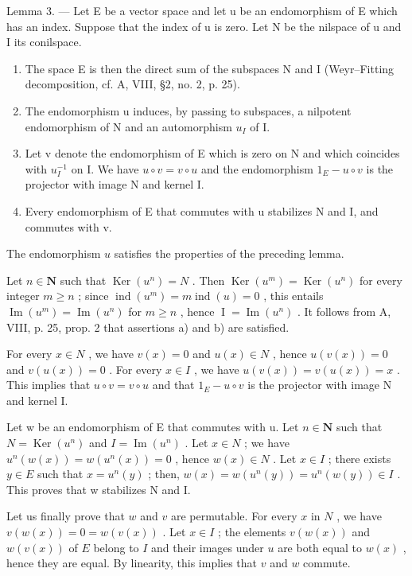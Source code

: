 Lemma 3. --- Let E be a vector space and let u be an endomorphism of E which has an index. Suppose that the index of u is zero. Let N be the nilspace of u and I its conilspace.

\begin{enumerate}
\def\labelenumi{\alph{enumi})}
\item
  The space E is then the direct sum of the subspaces N and I (Weyr–Fitting decomposition, cf. A, VIII, §2, no. 2, p. 25).
\item
  The endomorphism u induces, by passing to subspaces, a nilpotent endomorphism of N and an automorphism \(u_{I}\) of I.
\item
  Let v denote the endomorphism of E which is zero on N and which coincides with \(u_{I}^{-1}\) on I. We have \(u \circ v = v \circ u\) and the endomorphism \(1_{E} - u \circ v\) is the projector with image N and kernel I.
\item
  Every endomorphism of E that commutes with u stabilizes N and I, and commutes with v.
\end{enumerate}

The endomorphism \(u\) satisfies the properties of the preceding lemma.

Let \(n \in \mathbf{N}\) such that \(\operatorname{Ker}(u^{n}) = N\) . Then \(\operatorname{Ker}(u^{m}) = \operatorname{Ker}(u^{n})\) for every integer \(m \geqslant n\) ; since \(\operatorname{ind}(u^{m}) = m \operatorname{ind}(u) = 0\) , this entails \(\operatorname{Im}(u^{m}) = \operatorname{Im}(u^{n})\) for \(m \geqslant n\) , hence \(\operatorname{I} = \operatorname{Im}(u^{n})\) . It follows from A, VIII, p. 25, prop. 2 that assertions a) and b) are satisfied.

For every \(x \in N\) , we have \(v(x) = 0\) and \(u(x) \in N\) , hence \(u(v(x)) = 0\) and \(v(u(x)) = 0\) . For every \(x \in I\) , we have \(u(v(x)) = v(u(x)) = x\) . This implies that \(u \circ v = v \circ u\) and that \(1_{E} - u \circ v\) is the projector with image N and kernel I.

Let w be an endomorphism of E that commutes with u. Let \(n \in \mathbf{N}\) such that \(N = \operatorname{Ker}(u^{n})\) and \(I = \operatorname{Im}(u^{n})\) . Let \(x \in N\) ; we have \(u^{n}(w(x)) = w(u^{n}(x)) = 0\) , hence \(w(x) \in N\) . Let \(x \in I\) ; there exists \(y \in E\) such that \(x = u^{n}(y)\) ; then, \(w(x) = w(u^{n}(y)) = u^{n}(w(y)) \in I\) . This proves that w stabilizes N and I.

Let us finally prove that \(w\) and \(v\) are permutable. For every \(x\) in \(N\) , we have \(v(w(x)) = 0 = w(v(x))\) . Let \(x \in I\) ; the elements \(v(w(x))\) and \(w(v(x))\) of \(E\) belong to \(I\) and their images under \(u\) are both equal to \(w(x)\) , hence they are equal. By linearity, this implies that \(v\) and \(w\) commute.

